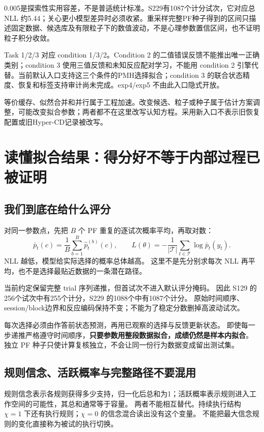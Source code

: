 \documentclass[11pt]{article}
\newcommand{\term}[1]{\textbf{#1}}
\begin{document}
0.005是探索性实用容差，不是普适统计标准。S229有1087个计分试次，它对应总 NLL 约5.44；关心更小模型差异时必须收紧。重采样完整PF种子得到的区间只描述固定数据、候选库及有限粒子下的数值波动，不是心理参数置信区间，也不证明粒子积分收敛。

Task 1/2/3 对应 condition 1/3/2。Condition 2 的二值错误反馈不能推出唯一正确类别；condition 3 使用三值反馈和未知反应配对学习，不能用 condition 2 引擎代替。当前默认入口支持这三个条件的PMH选择拟合；condition 3 的联合状态精度、恢复和标签支持审计尚未完成。exp4/exp5 不由此入口隐式开放。

等价缓存、似然合并和并行属于工程加速。改变候选、粒子或种子属于估计方案调整，可能改变拟合参数；两者都不在这里改写认知方程。采用新入口不表示旧恢复配置或旧Hyper-CD记录被改写。

\section{读懂拟合结果：得分好不等于内部过程已被证明}
\subsection{我们到底在给什么评分}
对同一参数点，先把 $B$ 个 PF 重复的逐试次概率平均，再取对数：
\begin{equation}
 \bar p_t(c)=\frac1B\sum_{b=1}^B\widehat p_t^{(b)}(c),\qquad
 L(\theta)=-\frac1{|\mathcal T|}\sum_{t\in\mathcal T}\log\bar p_t(y_t).
\end{equation}
NLL 越低，模型给实际选择的概率总体越高。
这里不是先分别求每次 NLL 再平均，也不是选择最贴近数据的一条潜在路径。

当前约定保留完整 trial 序列递推，但首试次不进入默认评分掩码。
因此 S129 的256个试次中有255个计分，S229 的1088个中有1087个计分。
原始时间顺序、session/block边界和反应编码保持不变；不能为了稳定分数删掉高波动试次。

每次选择必须由作答前状态预测，再用已观察的选择与反馈更新状态。
即使每一步递推严格遵守时间顺序，\term{只要参数用整段数据拟合，成绩仍然是样本内拟合}。
独立 PF 种子只使计算复核独立，不会让同一份行为数据变成留出测试集。

\subsection{规则信念、活跃概率与完整路径不要混用}
规则信念表示各规则获得多少支持，归一化后总和为1；活跃概率表示规则进入工作空间的可能性，其总和通常等于容量。
两者不能相互替代。持续执行结构 $\chi=1$ 下还有执行规则；$\chi=0$ 的信念混合读出没有这个变量。
不能把最大信念规则的变化直接称为被试的执行切换。
\end{document}
